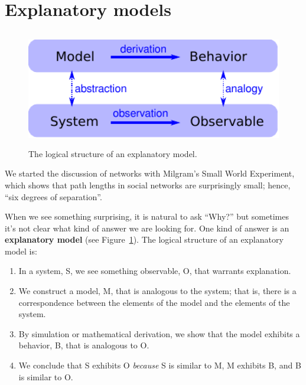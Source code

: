 \documentclass[12pt]{book}
\theoremstyle{exercise}
\begin{document}
\section{Explanatory models}
\label{model1}

\begin{figure}
\centerline{\includegraphics[height=2in]{figs/model.pdf}}
\caption{The logical structure of an explanatory model.\label{fig.model}}
\end{figure}

We started the discussion of networks with Milgram's Small World
Experiment, which shows that path lengths in social
networks are surprisingly small; hence, ``six degrees of separation''.

When we see something surprising, it is natural to ask ``Why?''  but
sometimes it's not clear what kind of answer we are looking for.  One
kind of answer is an {\bf explanatory model} (see
Figure~\ref{fig.model}).  The logical structure of an explanatory
model is: 

\begin{enumerate}

\item In a system, S, we see something observable, O, that warrants
  explanation.

\item We construct a model, M, that is analogous to the system; that
  is, there is a correspondence between the elements of the model and
  the elements of the system.

\item By simulation or mathematical derivation, we show that the model
  exhibits a behavior, B, that is analogous to O.

\item We conclude that S exhibits O {\em because} S is similar to M, M
  exhibits B, and B is similar to O.

\end{enumerate}
\end{document}
